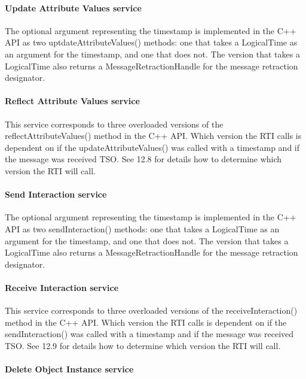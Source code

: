 \begin{compactstdpage}
    \paragraph{Update Attribute Values service}

    The optional argument representing the timestamp is implemented in the C++ API as two uptdateAttributeValues() methods: one that takes a LogicalTime as an argument for the timestamp, and one that does not. The version that takes a LogicalTime also returns a MessageRetractionHandle for the message retraction designator.

    \paragraph{Reflect Attribute Values \rtiinitiated{} service}

    This service corresponds to three overloaded versions of the reflectAttributeValues() method in the C++ API. Which version the RTI calls is dependent on if the updateAttributeValues() was called with a timestamp and if the message was received TSO. See 12.8 for details how to determine which version the RTI will call.

    \paragraph{Send Interaction service}

    The optional argument representing the timestamp is implemented in the C++ API as two sendInteraction() methods: one that takes a LogicalTime as an argument for the timestamp, and one that does not. The version that takes a LogicalTime also returns a MessageRetractionHandle for the message retraction designator.

    \paragraph{Receive Interaction \rtiinitiated{} service}

    This service corresponds to three overloaded versions of the receiveInteraction() method in the C++ API. Which version the RTI calls is dependent on if the sendInteraction() was called with a timestamp and if the message was received TSO. See 12.9 for details how to determine which version the RTI will call.

    \paragraph{Delete Object Instance service}


\end{compactstdpage}
